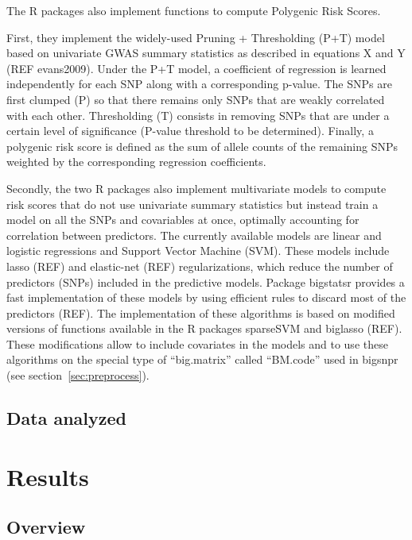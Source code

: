 \documentclass{bioinfo}
\begin{document}
\begin{methods}
The R packages also implement functions to compute Polygenic Risk Scores. 

First, they implement the widely-used Pruning + Thresholding (P+T) model based on univariate GWAS summary statistics as described in equations X and Y (REF evans2009). Under the P+T model, a coefficient of regression is learned independently for each SNP along with a corresponding p-value. The SNPs are first clumped (P) so that there remains only SNPs that are weakly correlated with each other. Thresholding (T) consists in removing SNPs that are under a certain level of significance (P-value threshold to be determined). Finally, a polygenic risk score is defined as the sum of allele counts of the remaining SNPs weighted by the corresponding regression coefficients. 

Secondly, the two R packages also implement multivariate models to compute risk scores that do not use univariate summary statistics but instead train a model on all the SNPs and covariables at once, optimally accounting for correlation between predictors. The currently available models are linear and logistic regressions and Support Vector Machine (SVM). These models include lasso (REF) and elastic-net (REF) regularizations, which reduce the number of  predictors (SNPs) included in the predictive models. Package bigstatsr provides a fast implementation of these models by using efficient rules to discard most of the predictors (REF). The implementation of these algorithms is based on modified versions of functions available in the R packages sparseSVM and biglasso (REF). These modifications allow to include covariates in the models and to use these algorithms on the special type of ``big.matrix'' called ``BM.code'' used in bigsnpr (see section~\ref{sec:preprocess}).

\subsection{Data analyzed}


\end{methods}

\section{Results}

\subsection{Overview}
\end{document}

